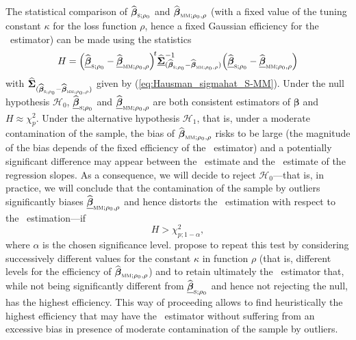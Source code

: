 The statistical comparison of $\sthat{\boldsymbol\beta}_{\stsc{S};\rho_0}$ and 
$\sthat{\boldsymbol\beta}_{\stsc{MM};\rho_0,\rho}$
(with a fixed value of the tuning constant $\kappa$ for the loss function
$\rho$, hence a fixed Gaussian efficiency for the ~estimator) can be made
using the statistics
%
\begin{equation}
    \label{Hausman_MMvsS}
    H = \left(\sthat{\underline{\boldsymbol\beta}}_{\stsc{S};\rho_0}
            - \sthat{\underline{\boldsymbol\beta}}_{\stsc{MM};\rho_0,\rho}\right)^{\!t}
        \sthat{\underline{\boldsymbol\Sigma}}_{(\sthat{\boldsymbol\beta}_{\stsc{S};\rho_0}
            - \sthat{\boldsymbol\beta}_{\stsc{MM};\rho_0,\rho})}^{-1}
        \left(\sthat{\underline{\boldsymbol\beta}}_{\stsc{S};\rho_0}
            - \sthat{\underline{\boldsymbol\beta}}_{\stsc{MM};\rho_0,\rho}\right)
\end{equation}
%
with $\sthat{\boldsymbol\Sigma}_{(\sthat{\boldsymbol\beta}_{\stsc{S};\rho_0} -
\sthat{\boldsymbol\beta}_{\stsc{MM};\rho_0,\rho})}$ given by
(\ref{eq:Hausman_sigmahat_S-MM}). Under the null hypothesis $\mathcal{H}_0$,
$\sthat{\underline{\boldsymbol\beta}}_{\stsc{S};\rho_0}$ and 
$\sthat{\underline{\boldsymbol\beta}}_{\stsc{MM};\rho_0,\rho}$ are both 
consistent estimators of \underline{$\boldsymbol\beta$} and $H \approx
\chi_p^2$. Under the alternative hypothesis $\mathcal{H}_1$, that is, under a
moderate contamination of the sample, the bias of
$\sthat{\boldsymbol\beta}_{\stsc{MM};\rho_0,\rho}$ risks to be large (the
magnitude of the bias depends of the fixed efficiency of the 
~estimator) and a potentially significant difference may appear between the
~estimate and the ~estimate of the regression slopes. As a
consequence, we will decide to reject $\mathcal{H}_0$---that is, in practice,
we will conclude that the contamination of the sample by outliers significantly
biases $\sthat{\underline{\boldsymbol\beta}}_{\stsc{MM};\rho_0,\rho}$ and hence
distorts the ~estimation with respect to the ~estimation---if
\[
    H > \chi_{p;1-\alpha}^2,
\]
where $\alpha$ is the chosen significance level. \citet{Dehon:2012}
propose to repeat this test by considering successively different values for
the constant $\kappa$ in function $\rho$ (that is, different levels for the
efficiency of $\sthat{\boldsymbol\beta}_{\stsc{MM};\rho_0,\rho}$) and
to retain ultimately the ~estimator that, while not being significantly
different from $\sthat{\underline{\boldsymbol\beta}}_{\stsc{S};\rho_0}$ 
and hence not rejecting the null, has the highest efficiency. This way of
proceeding allows to find heuristically the highest efficiency that may have
the ~estimator without suffering from an excessive bias in presence of
moderate contamination of the sample by outliers.


